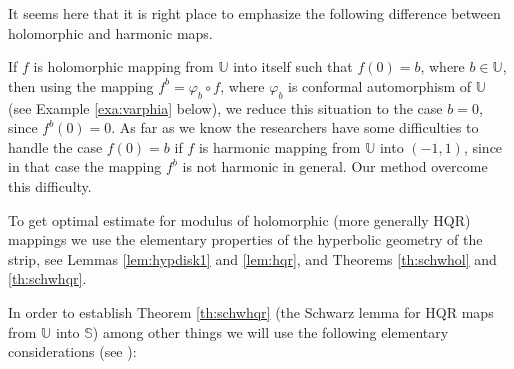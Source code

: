 \documentclass{amsart}
\begin{document}
It seems here  that it is right place to emphasize the following difference between holomorphic and harmonic maps.

If $f$ is holomorphic mapping from $\mathbb{U}$ into itself such that $f(0)=b$, where $b\in\mathbb{U}$, then using the mapping $f^b=\varphi_b \circ f$,
where $\varphi_b$ is conformal automorphism of $\mathbb{U}$ (see Example \ref{exa:varphia} below), we reduce this situation to the case $b=0$, since $f^b(0)=0$. As far as we know the researchers have some difficulties  to handle the case  $f(0)=b$  if  $f$ is harmonic mapping from $\mathbb{U}$ into $(-1,1)$,  since in that case the mapping  $f^b$  is not harmonic in general. Our method overcome this difficulty.




To get optimal estimate  for modulus of holomorphic
(more generally HQR)  mappings  we use
the elementary properties of  the hyperbolic
geometry  of the strip, see  Lemmas \ref{lem:hypdisk1}  and  \ref{lem:hqr}, and   Theorems \ref{th:schwhol} and  \ref{th:schwhqr}.


In order to establish Theorem \ref{th:schwhqr} (the Schwarz lemma for HQR maps from $\mathbb{U}$ into $\mathbb{S}$) among other things we will use the following elementary considerations (see \cite{MMSchw_Kob}):
\end{document}
